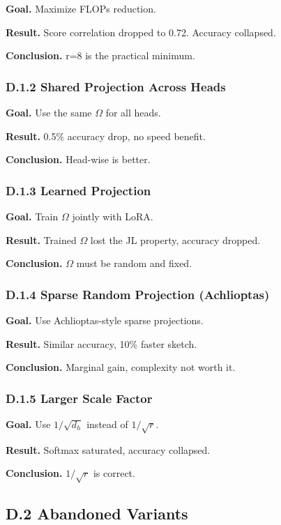 \textbf{Goal.} Maximize FLOPs reduction.

\textbf{Result.} Score correlation dropped to 0.72. Accuracy collapsed.

\textbf{Conclusion.} r=8 is the practical minimum.

\subsubsection{D.1.2 Shared Projection Across Heads}

\textbf{Goal.} Use the same $\Omega$ for all heads.

\textbf{Result.} 0.5\% accuracy drop, no speed benefit.

\textbf{Conclusion.} Head-wise is better.

\subsubsection{D.1.3 Learned Projection}

\textbf{Goal.} Train $\Omega$ jointly with LoRA.

\textbf{Result.} Trained $\Omega$ lost the JL property, accuracy dropped.

\textbf{Conclusion.} $\Omega$ must be random and fixed.

\subsubsection{D.1.4 Sparse Random Projection (Achlioptas)}

\textbf{Goal.} Use Achlioptas-style sparse projections.

\textbf{Result.} Similar accuracy, 10\% faster sketch.

\textbf{Conclusion.} Marginal gain, complexity not worth it.

\subsubsection{D.1.5 Larger Scale Factor}

\textbf{Goal.} Use $1/\sqrt{d_h}$ instead of $1/\sqrt{r}$.

\textbf{Result.} Softmax saturated, accuracy collapsed.

\textbf{Conclusion.} $1/\sqrt{r}$ is correct.

\subsection{D.2 Abandoned Variants}

